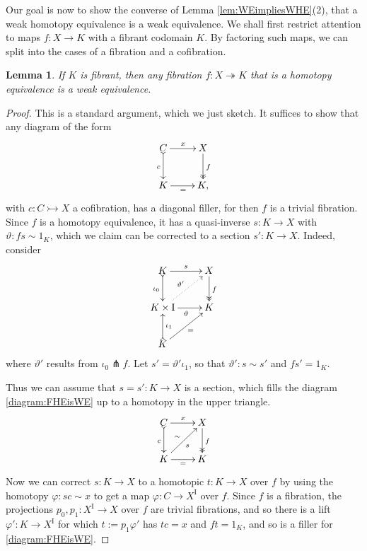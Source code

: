 \documentclass[11pt,reqno]{amsart}
\newcommand{\mono}{\ensuremath{\rightarrowtail}}
\newcommand{\ra}{\ensuremath{\rightarrow}}
\renewcommand{\to}{\ensuremath{\rightarrow}}
\newcommand{\onto}{\ensuremath{\twoheadrightarrow}}
\newcommand{\I}{\ensuremath{\mathrm{I}}}
\newtheorem{lemma}[theorem]{Lemma}
\theoremstyle{remark}
\theoremstyle{definition}
\begin{document}
Our goal is now to show the converse of Lemma \ref{lem:WEimpliesWHE}(2), that a weak homotopy equivalence is a weak equivalence. We shall first restrict attention to maps $f : X\to K$ with a fibrant codomain $K$.  By factoring such maps, we can split into the cases of a fibration and a cofibration.  

\begin{lemma}\label{FibHETFib}
If $K$ is fibrant, then any fibration $f : X \onto K$ that is a homotopy equivalence is a weak equivalence.
\end{lemma}
\begin{proof}
This is a standard argument, which we just sketch.  It suffices to show that any diagram of the form
\begin{equation}\label{diagram:FHEisWE}
\xymatrix{
C \ar@{>->}[d]_{c} \ar[r]^x & X \ar@{>>}[d]^{f} \\
K\ar[r]_{=} & K,
}
\end{equation}
with  $c : C \mono X$  a cofibration, has a diagonal filler, for then $f$ is a trivial fibration.  
Since $f$ is a homotopy equivalence, it has a quasi-inverse $s:K\ra X$ with $\vartheta : fs\sim 1_K$, which we claim can be corrected to a section $s' : K\ra X$. 
Indeed, consider 
\begin{equation*}%
\xymatrix{
K \ar@{>->}[d]_{\iota_0} \ar[r]^{s}  & X\ar@{>>}[d]^{f} \\
K\times \I \ar[r]_{\vartheta} \ar@{..>}[ru]^{\vartheta'}& K\\
K \ar@{>->}[u]_{\iota_1} \ar[ru]_=&
}
\end{equation*}
where $\vartheta' $ results from $\iota_0 \pitchfork f$. Let $s' = \vartheta' \iota_1$, so that $\vartheta' : s\sim s'$ and $fs' = 1_K$.

Thus we can assume that $s = s' : K\ra X$ is a section, which fills the diagram \eqref{diagram:FHEisWE} up to a homotopy in the upper triangle.
\begin{equation*}%
\xymatrix{
C \ar@{>->}[d]_{c} \ar[r]^x & X \ar@{>>}[d]^{f} \\
K\ar[r]_{=} \ar[ru]_{s}^{\sim} & K
}
\end{equation*}
Now we can correct $s: K\ra X$ to a homotopic $t : K\ra X$ over $f$ by using the homotopy $\varphi : sc\sim x$  to get a map $\varphi : C\ra X^\I$ over $f$.  Since $f$ is a fibration, the projections $p_0, p_1:X^\I \ra X$ over $f$ are trivial fibrations, and so there is a lift $\varphi': K\ra X^\I$ for which $t:= p_1\varphi'$ has $tc= x$ and $ft=1_K$, and so is a filler for \eqref{diagram:FHEisWE}.
\end{proof}
\end{document}
